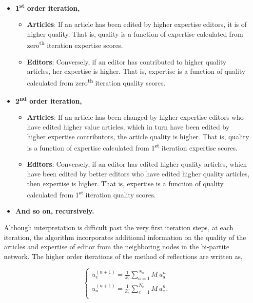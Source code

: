 \begin{itemize}
  \item {\bf 1\textsuperscript{st} order iteration,}  
  \begin{itemize}
  \item {\bf Articles}: If an article has been edited by higher expertise editors, it is of higher quality. That is, quality is a function of expertise calculated from zero\textsuperscript{th} iteration expertise scores.
  \item {\bf Editors}: Conversely, if an editor has contributed to higher quality articles, her expertise is higher. That is, expertise is a function of quality calculated from zero\textsuperscript{th} iteration quality scores.
  \end{itemize}
  \item {\bf 2\textsuperscript{nd} order iteration,}
    \begin{itemize}
  \item {\bf Articles}: If an article has been changed by higher expertise editors who have edited higher value articles, which in turn have been edited by higher expertise contributors, the article quality is higher. That is, quality is a function of expertise calculated from 1\textsuperscript{st} iteration expertise scores.
  \item {\bf Editors}: Conversely, if an editor has edited higher quality articles, which have been edited by better editors who have edited higher quality articles, then expertise is higher. That is, expertise is a function of quality calculated from 1\textsuperscript{st} iteration quality scores.
  \end{itemize}
 \item {\bf And so on, recursively.}\\
\end{itemize}

Although interpretation is difficult past the very first iteration steps, at each iteration, the algorithm incorporates additional information on the quality of the articles and expertise of editor from the neighboring nodes in the bi-partite network. The higher order iterations of the method of reflections are written as,

\begin{equation}
\begin{cases}
 u_{e}^{(n+1)} = \frac{1}{k_{e}}\sum_{a=1}^{N_{a}} M \, u_{a}^{n}\\[7pt]
 u_{a}^{(n+1)} = \frac{1}{k_{a}}\sum_{e=1}^{N_{e}} M \, u_{e}^{n}.\\
\end{cases}
\label{HHhigher}
\end{equation}

